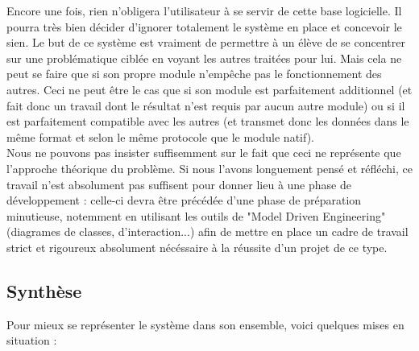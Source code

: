		Encore une fois, rien n'obligera l'utilisateur à se servir de cette base logicielle. Il pourra très bien décider d'ignorer totalement le système en place et concevoir le sien. Le but de ce système est vraiment de permettre à un élève de se concentrer sur une problématique ciblée en voyant les autres traitées pour lui. Mais cela ne peut se faire que si son propre module n'empêche pas le fonctionnement des autres. Ceci ne peut être le cas que si son module est parfaitement additionnel (et fait donc un travail dont le résultat n'est requis par aucun autre module) ou si il est parfaitement compatible avec les autres (et transmet donc les données dans le même format et selon le même protocole que le module natif).\\

		Nous ne pouvons pas insister suffisemment sur le fait que ceci ne représente que l'approche théorique du problème. Si nous l'avons longuement pensé et réfléchi, ce travail n'est absolument pas suffisent pour donner lieu à une phase de développement : celle-ci devra être précédée d'une phase de préparation minutieuse, notemment en utilisant les outils de "Model Driven Engineering" (diagrames de classes, d'interaction...) afin de mettre en place un cadre de travail strict et rigoureux absolument nécéssaire à la réussite d'un projet de ce type.

\subsection{Synthèse}
	Pour mieux se représenter le système dans son ensemble, voici quelques mises en situation :\\
	\vspace{25pt}
